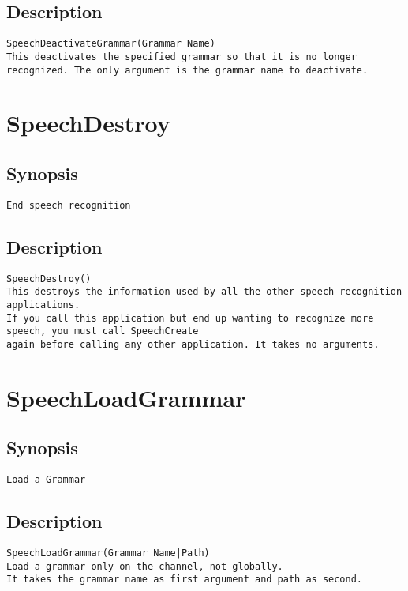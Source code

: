 \subsection{Description}
\begin{verbatim}
SpeechDeactivateGrammar(Grammar Name)
This deactivates the specified grammar so that it is no longer recognized. The only argument is the grammar name to deactivate.

\end{verbatim}


\section{SpeechDestroy}
\subsection{Synopsis}
\begin{verbatim}
End speech recognition
\end{verbatim}
\subsection{Description}
\begin{verbatim}
SpeechDestroy()
This destroys the information used by all the other speech recognition applications.
If you call this application but end up wanting to recognize more speech, you must call SpeechCreate
again before calling any other application. It takes no arguments.

\end{verbatim}


\section{SpeechLoadGrammar}
\subsection{Synopsis}
\begin{verbatim}
Load a Grammar
\end{verbatim}
\subsection{Description}
\begin{verbatim}
SpeechLoadGrammar(Grammar Name|Path)
Load a grammar only on the channel, not globally.
It takes the grammar name as first argument and path as second.

\end{verbatim}


